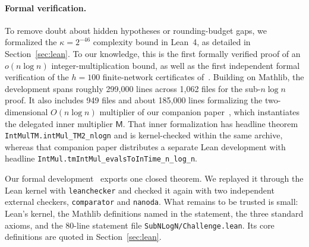 \paragraph{Formal verification.}
To remove doubt about hidden hypotheses or rounding-budget gaps, we formalized the $\kappa=2^{-46}$ complexity bound in Lean~4, as detailed in Section~\ref{sec:lean}. To our knowledge, this is the first formally verified proof of an $o(n\log n)$ integer-multiplication bound, as well as the first independent formal verification of the $h=100$ finite-network certificates of~\cite{OAI26}. Building on Mathlib, the development spans roughly 299{,}000 lines across 1{,}062 files for the sub-$n\log n$ proof. It also includes 949 files and about 185{,}000 lines formalizing the two-dimensional $O(n\log n)$ multiplier of our companion paper~\cite{MS}, which instantiates the delegated inner multiplier $\mathsf M$. That inner formalization has headline theorem \texttt{IntMulTM.\allowbreak intMul\_\allowbreak TM2\_\allowbreak nlogn} and is kernel-checked within the same archive, whereas that companion paper distributes a separate Lean development with headline \texttt{IntMul.\allowbreak tmIntMul\_\allowbreak evalsToInTime\_\allowbreak n\_\allowbreak log\_\allowbreak n}.

Our formal development~\cite{Lean26} exports one closed theorem. We replayed it through the Lean kernel with \texttt{leanchecker} and checked it again with two independent external checkers, \texttt{comparator} and \texttt{nanoda}. What remains to be trusted is small: Lean's kernel, the Mathlib definitions named in the statement, the three standard axioms, and the 80-line statement file \texttt{SubNLogN/\allowbreak Challenge.lean}. Its core definitions are quoted in Section~\ref{sec:lean}.

